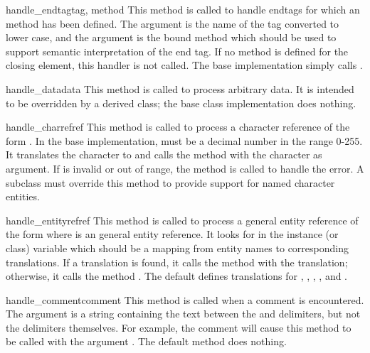 \begin{methoddesc}{handle_endtag}{tag, method}
This method is called to handle endtags for which an
 method has been defined.  The
 argument is the name of the tag converted to lower case, and
the  argument is the bound method which should be used to
support semantic interpretation of the end tag.  If no
 method is defined for the closing element,
this handler is not called.  The base implementation simply calls
.
\end{methoddesc}

\begin{methoddesc}{handle_data}{data}
This method is called to process arbitrary data.  It is intended to be
overridden by a derived class; the base class implementation does
nothing.
\end{methoddesc}

\begin{methoddesc}{handle_charref}{ref}
This method is called to process a character reference of the form
.  In the base implementation,  must
be a decimal number in the
range 0-255.  It translates the character to \ASCII{} and calls the
method  with the character as argument.  If
 is invalid or out of range, the method
 is called to handle the error.  A
subclass must override this method to provide support for named
character entities.
\end{methoddesc}

\begin{methoddesc}{handle_entityref}{ref}
This method is called to process a general entity reference of the
form  where  is an general entity
reference.  It looks for  in the instance (or class)
variable  which should be a mapping from entity
names to corresponding translations.  If a translation is found, it
calls the method  with the translation;
otherwise, it calls the method .
The default  defines translations for
, , , , and
.
\end{methoddesc}

\begin{methoddesc}{handle_comment}{comment}
This method is called when a comment is encountered.  The
 argument is a string containing the text between the
\samp{<!--} and \samp{-->} delimiters, but not the delimiters
themselves.  For example, the comment  will
cause this method to be called with the argument .  The
default method does nothing.
\end{methoddesc}

